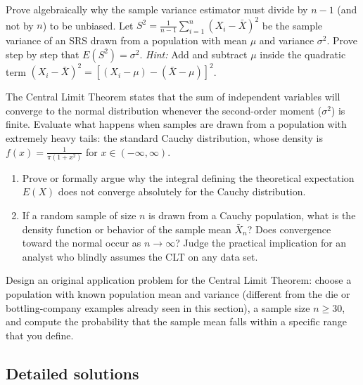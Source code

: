 \begin{problema}
	\label{prob:0c980d4}
	Prove algebraically why the sample variance estimator must divide by $n-1$ (and not by $n$) to be unbiased. Let $S^2 = \frac{1}{n-1} \sum_{i=1}^n (X_i - \bar{X})^2$ be the sample variance of an SRS drawn from a population with mean $\mu$ and variance $\sigma^2$. Prove step by step that $E(S^2) = \sigma^2$.
	\emph{Hint:} Add and subtract $\mu$ inside the quadratic term $(X_i - \bar{X})^2 = [(X_i - \mu) - (\bar{X} - \mu)]^2$.
\end{problema}

\begin{problema}
	\label{prob:293fd20}
	The Central Limit Theorem states that the sum of independent variables will converge to the normal distribution whenever the second-order moment ($\sigma^2$) is finite. Evaluate what happens when samples are drawn from a population with extremely heavy tails: the standard Cauchy distribution, whose density is $f(x) = \frac{1}{\pi(1+x^2)}$ for $x \in (-\infty, \infty)$.
	\begin{enumerate}
		\item Prove or formally argue why the integral defining the theoretical expectation $E(X)$ does not converge absolutely for the Cauchy distribution.
		\item If a random sample of size $n$ is drawn from a Cauchy population, what is the density function or behavior of the sample mean $\bar{X}_n$? Does convergence toward the normal occur as $n \to \infty$? Judge the practical implication for an analyst who blindly assumes the CLT on any data set.
	\end{enumerate}
\end{problema}

\begin{problema}
	\label{prob:b7567ec}
	Design an original application problem for the Central Limit Theorem: choose a population with known population mean and variance (different from the die or bottling-company examples already seen in this section), a sample size $n \ge 30$, and compute the probability that the sample mean falls within a specific range that you define.
\end{problema}

\subsection*{Detailed solutions}

